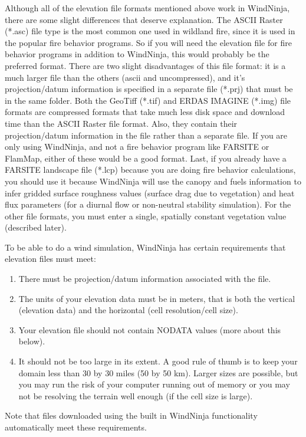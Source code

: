 \documentclass[12pt]{article}
\begin{document}
Although all of the elevation file formats mentioned above work in WindNinja, there are some slight differences that deserve explanation.  The ASCII Raster (*.asc) file type is the most common one used in wildland fire, since it is used in the popular fire behavior programs.  So if you will need the elevation file for fire behavior programs in addition to WindNinja, this would probably be the preferred format.  There are two slight disadvantages of this file format: it is a much larger file than the others (ascii and uncompressed), and it's projection/datum information is specified in a separate file (*.prj) that must be in the same folder.  Both the GeoTiff (*.tif) and ERDAS IMAGINE (*.img) file formats are compressed formats that take much less disk space and download time than the ASCII Raster file format.  Also, they contain their projection/datum information in the file rather than a separate file.  If you are only using WindNinja, and not a fire behavior program like FARSITE or FlamMap, either of these would be a good format.  Last, if you already have a FARSITE landscape file (*.lcp) because you are doing fire behavior calculations, you should use it because WindNinja will use the canopy and fuels information to infer gridded surface roughness values (surface drag due to vegetation) and heat flux parameters (for a diurnal flow or non-neutral stability simulation).  For the other file formats, you must enter a single, spatially constant vegetation value (described later).

To be able to do a wind simulation, WindNinja has certain requirements that elevation files must meet:
\begin{enumerate}
\item There must be projection/datum information associated with the file.
\item The units of your elevation data must be in meters, that is both the vertical (elevation data) and the horizontal (cell resolution/cell size).
\item Your elevation file should not contain NODATA values (more about this below).
\item It should not be too large in its extent.  A good rule of thumb is to keep your domain less than 30 by 30 miles (50 by 50 km).  Larger sizes are possible, but you may run the risk of your computer running out of memory or you may not be resolving the terrain well enough (if the cell size is large).
\end{enumerate}

Note that files downloaded using the built in WindNinja functionality automatically meet these requirements.
\end{document}
